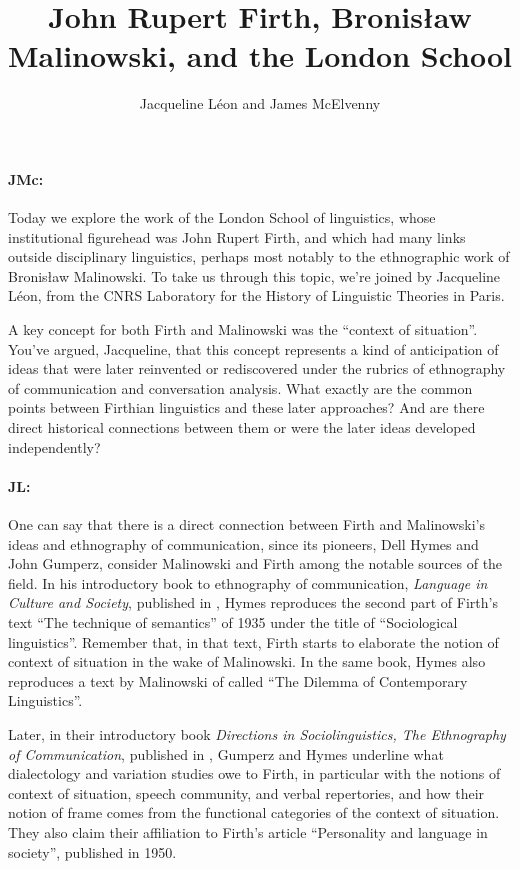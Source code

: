 \documentclass[output=paper]{langscibook}
\author{Jacqueline Léon\orcid{}\affiliation{University of Paris, CNRS Histoire des theories linguistiques} and James McElvenny\affiliation{University of Siegen}}
\title{John Rupert Firth, Bronisław Malinowski, and the London School}
\begin{document}
\maketitle 

\paragraph*{JMc:} Today we explore the work of the London School of linguistics, whose institutional figurehead was John Rupert Firth, and which had many links outside disciplinary linguistics, perhaps most notably to the ethnographic work of Bronisław Malinowski. To take us through this topic, we’re joined by Jacqueline Léon, from the CNRS Laboratory for the History of Linguistic Theories in Paris.

A key concept for both Firth and Malinowski was the “context of situation”. You’ve argued, Jacqueline, that this concept represents a kind of anticipation of ideas that were later reinvented or rediscovered under the rubrics of ethnography of communication and conversation analysis. What exactly are the common points between Firthian linguistics and these later approaches? And are there direct historical connections between them or were the later ideas developed independently?

\paragraph*{JL:} One can say that there is a direct connection between Firth and Malinowski’s ideas and ethnography of communication, since its pioneers, Dell Hymes and John Gumperz, consider Malinowski and Firth among the notable sources of the field. In his introductory book to ethnography of communication, \textit{Language in Culture and Society}, published in \citeyear{hymes1964a}, Hymes reproduces the second part of Firth’s text “The technique of semantics” of 1935 under the title of “Sociological linguistics”. Remember that, in that text, Firth starts to elaborate the notion of context of situation in the wake of Malinowski. In the same book, Hymes also reproduces a text by Malinowski of \citeyear{malinowski1937a} called “The Dilemma of Contemporary Linguistics”.

Later, in their introductory book \textit{Directions in Sociolinguistics, The Ethnography of Communication}, published in \citeyear{gumperz1972a}, Gumperz and Hymes underline what dialectology and variation studies owe to Firth, in particular with the notions of context of situation, speech community, and verbal repertories, and how their notion of frame comes from the functional categories of the context of situation. They also claim their affiliation to Firth’s article “Personality and language in society”, published in 1950.
\end{document}
